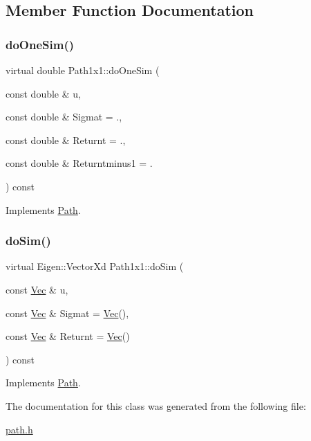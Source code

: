 \subsection{Member Function Documentation}
\hypertarget{classPath1x1_a522e73958cc571997153baa179b451cd}{}\label{classPath1x1_a522e73958cc571997153baa179b451cd} 
\subsubsection{\texorpdfstring{do\+One\+Sim()}{doOneSim()}}
{\footnotesize\ttfamily virtual double Path1x1\+::do\+One\+Sim (\begin{DoxyParamCaption}\item[{const double \&}]{u,  }\item[{const double \&}]{Sigmat = {.},  }\item[{const double \&}]{Returnt = {.},  }\item[{const double \&}]{Returntminus1 = {.} }\end{DoxyParamCaption}) const\hspace{0.3cm}{\ttfamily [virtual]}}



Implements \hyperlink{classPath_a6e75e5a329c48cafecd03a355f90b694}{Path}.

\hypertarget{classPath1x1_abd21c19e5283035ebe2ca01711134e4c}{}\label{classPath1x1_abd21c19e5283035ebe2ca01711134e4c} 
\subsubsection{\texorpdfstring{do\+Sim()}{doSim()}}
{\footnotesize\ttfamily virtual Eigen\+::\+Vector\+Xd Path1x1\+::do\+Sim (\begin{DoxyParamCaption}\item[{const \hyperlink{compute__returns__eigen_8h_a1eb6a9306ef406d7975f3cbf2e247777}{Vec} \&}]{u,  }\item[{const \hyperlink{compute__returns__eigen_8h_a1eb6a9306ef406d7975f3cbf2e247777}{Vec} \&}]{Sigmat = {\ttfamily \hyperlink{compute__returns__eigen_8h_a1eb6a9306ef406d7975f3cbf2e247777}{Vec}()},  }\item[{const \hyperlink{compute__returns__eigen_8h_a1eb6a9306ef406d7975f3cbf2e247777}{Vec} \&}]{Returnt = {\ttfamily \hyperlink{compute__returns__eigen_8h_a1eb6a9306ef406d7975f3cbf2e247777}{Vec}()} }\end{DoxyParamCaption}) const\hspace{0.3cm}{\ttfamily [virtual]}}



Implements \hyperlink{classPath_a8917612a585bce52dbd52b1b643a517a}{Path}.



The documentation for this class was generated from the following file\+:\begin{DoxyCompactItemize}
\item 
\hyperlink{path_8h}{path.\+h}\end{DoxyCompactItemize}
